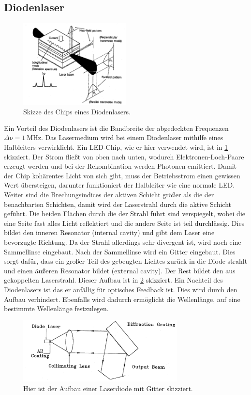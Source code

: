 \subsection{Diodenlaser}
\begin{figure}[h!]
	\centering
	\includegraphics[width = 0.5\textwidth]{../Grafiken/Schematische_Ansicht_Laserdiode.pdf}
	\caption{Skizze des Chips eines Diodenlasers.\cite{V60}\label{fig:Halleiter-Chip}}
\end{figure}
Ein Vorteil des Diodenlasers ist die Bandbreite der abgedeckten Frequenzen $\Delta \nu = \SI{1}{\mega\hertz}$.
Das Lasermedium wird bei einem Diodenlaser mithilfe eines Halbleiters verwirklicht.
Ein LED-Chip, wie er hier verwendet wird, ist in \cref{fig:Halleiter-Chip} skizziert.
Der Strom fließt von oben nach unten, wodurch Elektronen-Loch-Paare erzeugt werden und bei der Rekombination werden Photonen emittiert.
Damit der Chip kohärentes Licht von sich gibt, muss der Betriebsstrom einen gewissen Wert übersteigen, darunter funktioniert der Halbleiter wie eine normale LED.
Weiter sind die Brechungsindices der aktiven Schicht größer als die der benachbarten Schichten, damit wird der Laserstrahl durch die aktive Schicht geführt.
Die beiden Flächen durch die der Strahl führt sind verspiegelt, wobei die eine Seite fast alles Licht reflektiert und die andere Seite ist teil durchlässig.
Dies bildet den inneren Resonator (internal cavity) und gibt dem Laser eine bevorzugte Richtung.
Da der Strahl allerdings sehr divergent ist, wird noch eine Sammellinse eingebaut.
Nach der Sammellinse wird ein Gitter eingebaut.
Dies sorgt dafür, dass ein großer Teil des gebeugten Lichtes zurück in die Diode strahlt und einen äußeren Resonator bildet (external cavity).
Der Rest bildet den aus gekoppelten Laserstrahl.
Dieser Aufbau ist in \cref{fig:Aufbau_Gitter_Laserdiode} skizziert.
Ein Nachteil des Diodenlasers ist das er anfällig für optisches Feedback ist.
Dies wird durch den Aufbau verhindert.
Ebenfalls wird dadurch ermöglicht die Wellenlänge, auf eine bestimmte Wellenlänge festzulegen.
\begin{figure}
	\centering
	\includegraphics[width = 0.75\textwidth]{../Grafiken/Aufbau_Gitter_Laserdiode.pdf}
	\caption{Hier ist der Aufbau einer Laserdiode mit Gitter skizziert.\cite{V60}\label{fig:Aufbau_Gitter_Laserdiode}}
\end{figure}
\newpage

